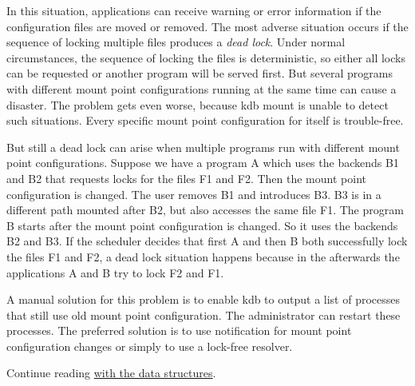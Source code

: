 In this situation, applications can receive warning or error information if the configuration files are moved or removed. The most adverse situation occurs if the sequence of locking multiple files produces a {\itshape dead lock}. Under normal circumstances, the sequence of locking the files is deterministic, so either all locks can be requested or another program will be served first. But several programs with different mount point configurations running at the same time can cause a disaster. The problem gets even worse, because {\ttfamily kdb mount} is unable to detect such situations. Every specific mount point configuration for itself is trouble-\/free.

But still a dead lock can arise when multiple programs run with different mount point configurations. Suppose we have a program {\ttfamily A} which uses the backends {\ttfamily B1} and {\ttfamily B2} that requests locks for the files {\ttfamily F1} and {\ttfamily F2}. Then the mount point configuration is changed. The user removes {\ttfamily B1} and introduces {\ttfamily B3}. {\ttfamily B3} is in a different path mounted after {\ttfamily B2}, but also accesses the same file {\ttfamily F1}. The program {\ttfamily B} starts after the mount point configuration is changed. So it uses the backends {\ttfamily B2} and {\ttfamily B3}. If the scheduler decides that first {\ttfamily A} and then {\ttfamily B} both successfully lock the files {\ttfamily F1} and {\ttfamily F2}, a dead lock situation happens because in the afterwards the applications {\ttfamily A} and {\ttfamily B} try to lock {\ttfamily F2} and {\ttfamily F1}.

A manual solution for this problem is to enable {\ttfamily kdb} to output a list of processes that still use old mount point configuration. The administrator can restart these processes. The preferred solution is to use notification for mount point configuration changes or simply to use a lock-\/free resolver.

Continue reading \hyperlink{md_doc_help_elektra-data-structures_doc_help_elektra-data-structures_md}{with the data structures}. 